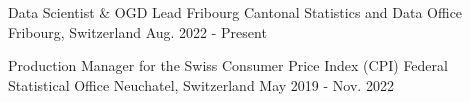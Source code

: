 
\begin{cventries}
  \cventry
    {Data Scientist \& OGD Lead}
    {Fribourg Cantonal Statistics and Data Office}
    {Fribourg, Switzerland}
    {Aug. 2022 - Present}
    {
      \begin{cvitems}
        \item {\ExpCurrentPipeline}
        \item {\ExpCurrentPortal}
        \item {\ExpCurrentGovernance}
        \item {\ExpCurrentLeadership}
      \end{cvitems}
    }

  \cventry
    {Production Manager for the Swiss Consumer Price Index (CPI)}
    {Federal Statistical Office}
    {Neuchatel, Switzerland}
    {May 2019 - Nov. 2022}
    {
      \begin{cvitems}
        \item {\ExpCpiProcessing}
        \item {\ExpCpiQuality}
        \item {\ExpCpiModeling}
        \item {\ExpCpiLeadership}
      \end{cvitems}
    }
\end{cventries}
